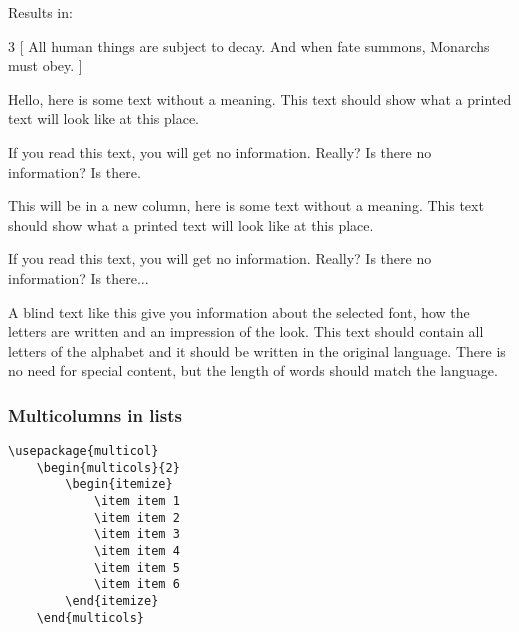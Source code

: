 Results in:

\setlength{\columnseprule}{1pt}
\def\columnseprulecolor{\color{blue}}

\begin{multicols}{3}
[
All human things are subject to decay. And when fate summons, Monarchs must obey.
]
 
Hello, here is some text without a meaning.  This text should show what 
a printed text will look like at this place.



If you read this text, you will get no information.  Really?  Is there 
no information?  Is there.
 
\columnbreak
 
This will be in a new column, here is some text without a meaning.  This text 
should show what a printed text will look like at this place.
 
If you read this text, you will get no information.  Really?  Is there 
no information?  Is there...

A blind text like this give you information about the selected font, how the letters are written and an impression of the look. This text should contain all letters of the alphabet and it should be written in the original language. There is no need for special content, but the length of words should match the language.
\end{multicols}

\setlength{\columnseprule}{0pt}
\def\columnseprulecolor{\color{black}}


\subsubsection{Multicolumns in lists}
\begin{lstlisting}[language=Tex]
    \usepackage{multicol}
    \begin{multicols}{2}
        \begin{itemize}
            \item item 1
            \item item 2
            \item item 3
            \item item 4
            \item item 5
            \item item 6
        \end{itemize}
    \end{multicols}
\end{lstlisting}

